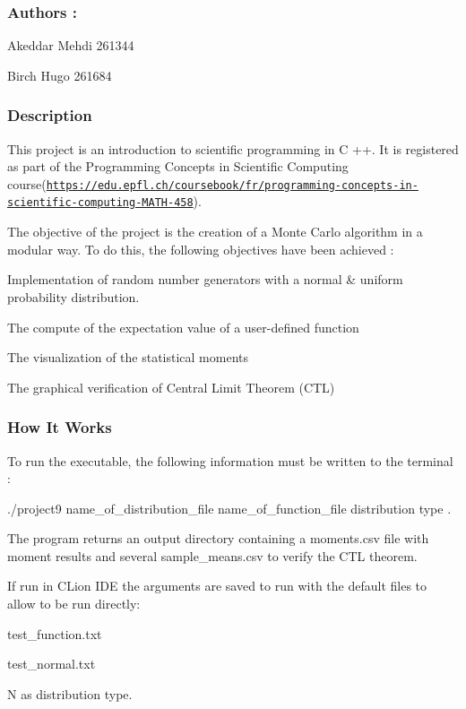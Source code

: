 \subsubsection*{Authors \+:}

Akeddar Mehdi 261344

Birch Hugo 261684

\subsubsection*{Description}

This project is an introduction to scientific programming in C ++. It is registered as part of the Programming Concepts in Scientific Computing course(\href{https://edu.epfl.ch/coursebook/fr/programming-concepts-in-scientific-computing-MATH-458}{\tt https\+://edu.\+epfl.\+ch/coursebook/fr/programming-\/concepts-\/in-\/scientific-\/computing-\/\+M\+A\+T\+H-\/458}).

The objective of the project is the creation of a Monte Carlo algorithm in a modular way. To do this, the following objectives have been achieved \+:
\begin{DoxyItemize}
\item Implementation of random number generators with a normal \& uniform probability distribution.
\item The compute of the expectation value of a user-\/defined function
\item The visualization of the statistical moments
\item The graphical verification of Central Limit Theorem (C\+TL)
\end{DoxyItemize}

\subsubsection*{How It Works}

To run the executable, the following information must be written to the terminal \+:

\textquotesingle{}./project9 name\+\_\+of\+\_\+distribution\+\_\+file name\+\_\+of\+\_\+function\+\_\+file distribution type\textquotesingle{} .

The program returns an output directory containing a \textquotesingle{}moments.\+csv\textquotesingle{} file with moment results and several \textquotesingle{}sample\+\_\+means.\+csv\textquotesingle{} to verify the C\+TL theorem.

If run in C\+Lion I\+DE the arguments are saved to run with the default files to allow to be run directly\+:
\begin{DoxyItemize}
\item test\+\_\+function.\+txt
\item test\+\_\+normal.\+txt
\item \textquotesingle{}N\textquotesingle{} as distribution type.
\end{DoxyItemize}


